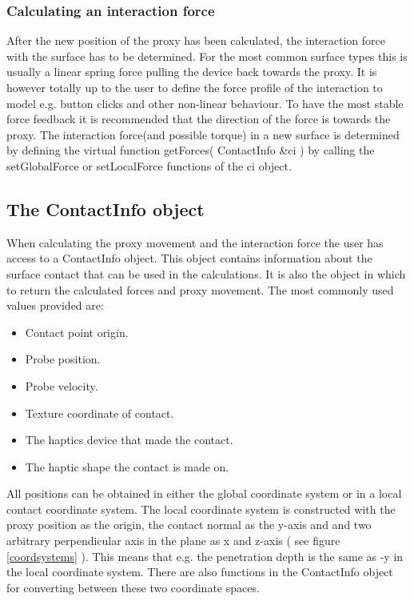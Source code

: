 \subsubsection{Calculating an interaction force}
After the new position of the proxy has been calculated, the interaction force with the surface has to be determined. For the most common surface types this is usually a linear spring force pulling the device back towards the proxy. It is however totally up to the user to define the force profile of the interaction to model e.g. button clicks and other non-linear behaviour. To have the most stable force feedback it is recommended that the direction of the force is towards the proxy.  
The interaction force(and possible torque) in a new surface is determined by defining the virtual function {\ttfamily getForces( ContactInfo \&ci )} by calling the setGlobalForce or setLocalForce functions of the ci object. 

\subsection{The ContactInfo object}
When calculating the proxy movement and the interaction force the user has access to a ContactInfo object. This object contains information about the surface contact that can be used in the calculations. It is also the object in which to return the calculated forces and proxy movement. The most commonly used values provided are:

\begin{itemize}
\item Contact point origin.
\item Probe position.
\item Probe velocity.
\item Texture coordinate of contact.
\item The haptics device that made the contact.
\item The haptic shape the contact is made on.
\end{itemize}


All positions can be obtained in either the global coordinate system or
in a local contact coordinate system. The local coordinate system is constructed with the proxy position as the origin, the contact normal as the y-axis and and two arbitrary perpendicular axis in the plane as x and z-axis ( see figure \ref{coordsystems} ). This means that e.g. the penetration depth is the same as -y in the local coordinate system. There are also functions in the ContactInfo object for converting between these two coordinate spaces. 

